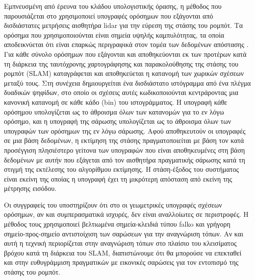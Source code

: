 Εμπνευσμένη από έρευνα του κλάδου υπολογιστικής όρασης, η μέθοδος που
παρουσιάζεται στο \cite{Himstedt2014} χρησιμοποιεί υπογραφές ορόσημων που
εξάγονται από δισδιάστατες μετρήσεις αισθητήρα lidar για την εύρεση της στάσης
του ρομπότ. Τα ορόσημα που χρησιμοποιούνται είναι σημεία υψηλής καμπυλότητας,
τα οποία αποδεικνύεται ότι είναι επαρκώς περιγραφικά στον τομέα των δεδομένων
απόστασης \cite{Tipaldi2010}. Για κάθε σύνολο ορόσημων που εξάγονται και
αποθηκεύονται εκ των προτέρων κατά τη διάρκεια της ταυτόχρονης χαρτογράφησης
και παρακολούθησης της στάσης του ρομπότ (SLAM) καταγράφεται και αποθηκεύεται η
κατανομή των χωρικών σχέσεων μεταξύ τους. Στη συνέχεια δημιουργείται ένα
δισδιάστατο ιστόγραμμα από ένα πλέγμα δυαδικών ψηφίδων, στο οποίο οι σχέσεις
αυτές κωδικοποιούνται κεντράροντας μια κανονική κατανομή σε κάθε κάδο (bin) του
ιστογράμματος. Η υπογραφή κάθε ορόσημου υπολογίζεται ως το άθροισμα όλων των
κατανομών για το εν λόγω ορόσημο, και η υπογραφή της σάρωσης υπολογίζεται
ως το άθροισμα όλων των υπογραφών των ορόσημων της εν λόγω σάρωσης.
Αφού αποθηκευτούν οι υπογραφές σε μια βάση δεδομένων, η εκτίμηση της στάσης
πραγματοποιείται με βάση τον κατά προσέγγιση πλησιέστερο γείτονα των υπογραφών
που είναι αποθηκευμένες στη βάση δεδομένων με αυτήν που εξάγεται από τον
αισθητήρα πραγματικής σάρωσης κατά τη στιγμή της εκτέλεσης του αλγορίθμου
εκτίμησης. Η στάση-έξοδος του συστήματος είναι εκείνη της οποίας η υπογραφή
έχει τη μικρότερη απόσταση από εκείνη της μέτρησης εισόδου.

Οι συγγραφείς του \cite{Kallasi2016} υποστηρίζουν ότι στο \cite{Himstedt2014} οι
γεωμετρικές υπογραφές σχέσεων ορόσημων, αν και συμπερασματικά ισχυρές, δεν
είναι αναλλοίωτες σε περιστροφές. Η μέθοδος τους χρησιμοποιεί βελτιωμένα
σημεία-κλειδιά τύπου falko και γρήγορη σημείο-προς-σημείο αντιστοίχιση των
σαρώσεων για την αναγνώριση τόπων. Αν και αυτή η τεχνική περιορίζεται στην
αναγνώριση τόπων στο πλαίσιο του κλεισίματος βρόχου κατά τη διάρκεια του SLAM,
διαπιστώνουμε ότι θα μπορούσε να επεκταθεί και στην ευθυγράμμιση πραγματικών με
εικονικές σαρώσεις για τον εντοπισμό της στάσης του ρομπότ.

